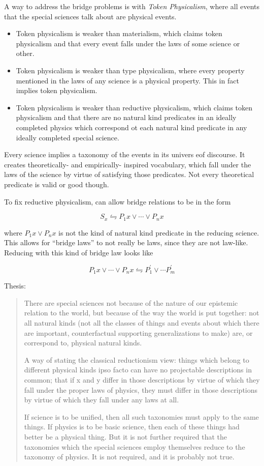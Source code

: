 \documentclass{article}
\newcommand{\ti}[1]{\textit{#1}}
\newcommand{\p}{^\prime}
\begin{document}
A way to address the bridge problems is with \ti{Token Physicalism}, where all events that the special sciences talk about are physical events.
\begin{itemize}
    \item Token physicalism is weaker than materialism, which claims token physicalism and that every event falls under the laws of some science or other.
    \item Token physicalism is weaker than type physicalism, where every property mentioned in the laws of any science is a physical property. This in fact implies token physicalism.
    \item Token physicalism is weaker than reductive physicalism, which claims token physicalism and that there are no natural kind predicates in an ideally completed physics which correspond ot each natural kind predicate in any ideally completed special science.
\end{itemize}

Every science implies a taxonomy of the events in its univers eof discourse. It creates theoretically- and empirically- inspired vocabulary, which fall under the laws of the science by virtue of satisfying those predicates. Not every theoretical predicate is valid or good though.

To fix reductive physicalism, can allow bridge relations to be in the form

$$
    S_x \leftrightharpoons P_1 x \lor \cdots \lor P_n x
$$

where $P_1 x \lor P_n x$ is not the kind of natural kind predicate in the reducing science. This allows for ``bridge laws'' to not really be laws, since they are not law-like. Reducing with this kind of bridge law looks like

$$
    P_1 x \lor \cdots \lor P_n x \leftrightharpoons P\p_1 \lor \cdots P\p_m
$$

Thesis:

\begin{quote}
There are special sciences not because of the nature of our epistemic relation to the world, but because of the way the world is put together: not all natural kinds (not all the classes of things and events about which there are important, counterfactual supporting generalizations to make) are, or correspond to, physical natural kinds.

A way of stating the classical reductionism view: things which belong to different physical kinds ipso facto can have no projectable descriptions in common; that if x and y differ in those descriptions by virtue of which they fall under the proper laws of physics, they must differ in those descriptions by virtue of which they fall under any laws at all.

If science is to be unified, then all such taxonomies must apply to the same things. If physics is to be basic science, then each of these things had better be a physical thing. But it is not further required that the taxonomies which the special sciences employ themselves reduce to the taxonomy of physics. It is not required, and it is probably not true.
\end{quote}
\end{document}
